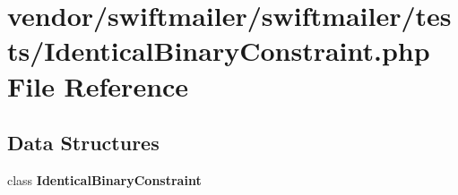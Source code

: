 \section{vendor/swiftmailer/swiftmailer/tests/\+Identical\+Binary\+Constraint.php File Reference}
\label{_identical_binary_constraint_8php}
\subsection*{Data Structures}
\begin{DoxyCompactItemize}
\item 
class {\bf Identical\+Binary\+Constraint}
\end{DoxyCompactItemize}

